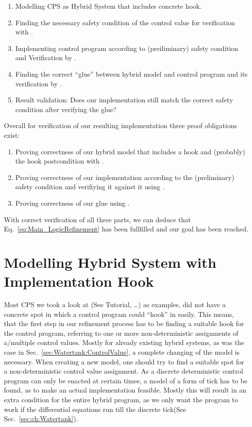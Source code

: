 \begin{enumerate}
	\item Modelling CPS as Hybrid System that includes concrete hook.
	\item Finding the necessary safety condition of the control value for verification with \keym.
	\item Implementing control program according to (preiliminary) safety condition and Verification by \key.		
	\item Finding the correct ``glue'' between hybrid model and control program and its verification by \keym.
	\item Result validation: Does our implementation still match the correct safety condition after verifying the glue?
\end{enumerate}

Overall for verification of our resulting implementation three proof obligations exist:
\begin{enumerate}[label=\roman*]
	\item Proving correctness of our hybrid model that includes a hook and (probably) the hook postcondition with \keym.
	\item Proving correctness of our implementation according to the (preliminary) safety condition and verifiying it against it using \key.
	\item Proving correctness of our glue using \keym.
\end{enumerate} 

With correct verification of all three parts, we can deduce that Eq.~\ref{eq:Main_LogicRefinement} has been fullfilled and our goal has been reached.

\section{Modelling Hybrid System with Implementation Hook}
\label{sec:Process:Hook}
Most CPS we took a look at (See \cite{keymaera} Tutorial, \cite[p.~5, p.~11]{platzer2010b} \dots) as examples, did not have a concrete spot in which a control program could ``hook'' in easily. This means, that the first step in our refinement process has to be finding a suitable hook for the control program, referring to one or more non-deterministic assignments of a/multiple control values. Mostly for already existing hybrid systems, as was the case in Sec.~\ref{sec:Watertank:ControlValue}, a complete changing of the model is necessary. When creating a new model, one should try to find a suitable spot for a non-deterministic control value assignment. As a discrete deterministic control program can only be enacted at certain times, a model of a form of tick has to be found, as to make an actual implementation feasible. Mostly this will result in an extra condition for the entire hybrid program, as we only want the program to work if the differential equations run till the discrete tick(See Sec.~\ref{sec:ch:Watertank}).

